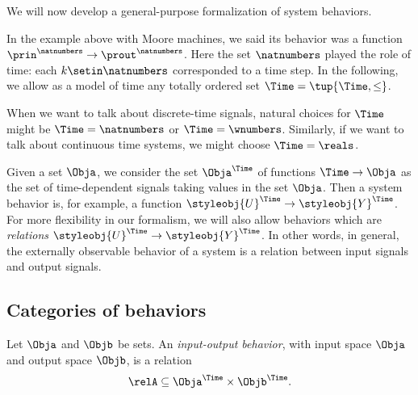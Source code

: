 We will now develop a general-purpose formalization of system behaviors.

In the example above with Moore machines, we said its behavior was a function $\prin^\natnumbers \to \prout^\natnumbers$.
Here the set $\natnumbers$ played the role of time: each $k \setin \natnumbers$ corresponded to a time step.
In the following, we allow as a model of time any totally ordered set $\Time = \tup{\Time, \leq}$.

When we want to talk about discrete-time signals, natural choices for $\Time$ might be $\Time = \natnumbers$ or $\Time = \wnumbers$.
Similarly, if we want to talk about continuous time systems, we might choose $\Time = \reals$.

Given a set $\Obja$, we consider the set $\Obja^\Time$ of functions $\Time \to \Obja$ as the set of time-dependent signals taking values in the set $\Obja$.
Then a system behavior is, for example, a function $\styleobj{U}^\Time \to \styleobj{Y}^\Time$.
For more flexibility in our formalism, we will also allow behaviors which are \emph{relations} $\styleobj{U}^\Time \to \styleobj{Y}^\Time$.
In other words, in general, the externally observable behavior of a system is a relation between input signals and output signals.

\subsection{Categories of behaviors}

\begin{definition}
    Let $\Obja$ and $\Objb$ be sets.
    An \emph{input-output behavior}, with input space $\Obja$ and output space $\Objb$, is a relation
    \begin{equation}
        \relA \subseteq \Obja^\Time \times \Objb^\Time.
    \end{equation}
\end{definition}

